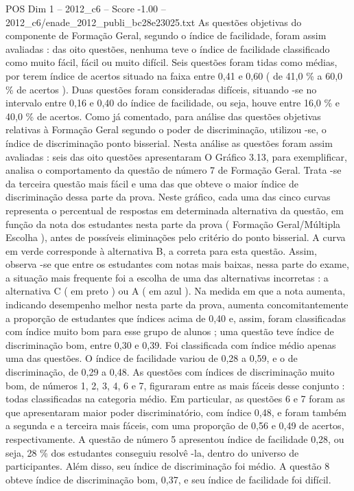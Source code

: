 \begin{textsample}{POS Dim 1 – 2012\_c6 – Score -1.00 – 2012\_c6/enade\_2012\_publi\_bc28e23025.txt}
As questões objetivas do componente de Formação Geral, segundo o índice de facilidade, foram assim avaliadas : das oito questões, nenhuma teve o índice de facilidade classificado como muito fácil, fácil ou muito difícil.
Seis questões foram tidas como médias, por terem índice de acertos situado na faixa entre 0,41 e 0,60 ( de 41,0 \% a 60,0 \% de acertos ).
Duas questões foram consideradas difíceis, situando -se no intervalo entre 0,16 e 0,40 do índice de facilidade, ou seja, houve entre 16,0 \% e 40,0 \% de acertos.
Como já comentado, para análise das questões objetivas relativas à Formação Geral segundo o poder de discriminação, utilizou -se, o índice de discriminação ponto bisserial.
Nesta análise as questões foram assim avaliadas : seis das oito questões apresentaram O Gráfico 3.13, para exemplificar, analisa o comportamento da questão de número 7 de Formação Geral.
Trata -se da terceira questão mais fácil e uma das que obteve o maior índice de discriminação dessa parte da prova.
Neste gráfico, cada uma das cinco curvas representa o percentual de respostas em determinada alternativa da questão, em função da nota dos estudantes nesta parte da prova ( Formação Geral/Múltipla Escolha ), antes de possíveis eliminações pelo critério do ponto bisserial.
A curva em verde corresponde à alternativa B, a correta para esta questão.
Assim, observa -se que entre os estudantes com notas mais baixas, nessa parte do exame, a situação mais frequente foi a escolha de uma das alternativas incorretas : a alternativa C ( em preto ) ou A ( em azul ).
Na medida em que a nota aumenta, indicando desempenho melhor nesta parte da prova, aumenta concomitantemente a proporção de estudantes que índices acima de 0,40 e, assim, foram classificadas com índice muito bom para esse grupo de alunos ; uma questão teve índice de discriminação bom, entre 0,30 e 0,39.
Foi classificada com índice médio apenas uma das questões.
O índice de facilidade variou de 0,28 a 0,59, e o de discriminação, de 0,29 a 0,48.
As questões com índices de discriminação muito bom, de números 1, 2, 3, 4, 6 e 7, figuraram entre as mais fáceis desse conjunto : todas classificadas na categoria médio.
Em particular, as questões 6 e 7 foram as que apresentaram maior poder discriminatório, com índice 0,48, e foram também a segunda e a terceira mais fáceis, com uma proporção de 0,56 e 0,49 de acertos, respectivamente.
A questão de número 5 apresentou índice de facilidade 0,28, ou seja, 28 \% dos estudantes conseguiu resolvê -la, dentro do universo de participantes.
Além disso, seu índice de discriminação foi médio.
A questão 8 obteve índice de discriminação bom, 0,37, e seu índice de facilidade foi difícil.

\end{textsample}
